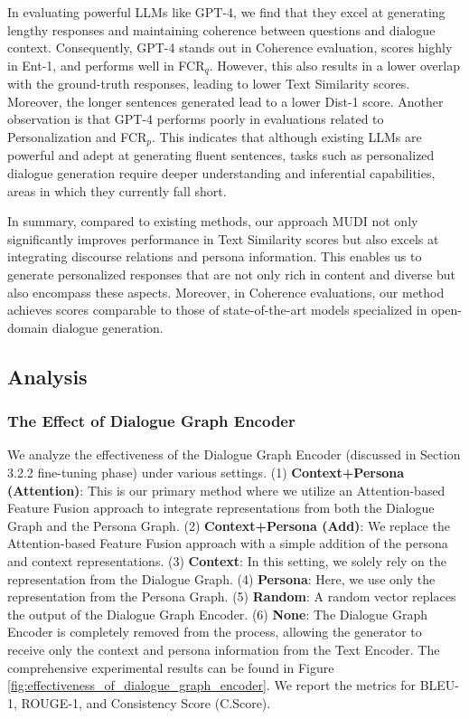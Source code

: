 \documentclass[letterpaper]{article} %
\begin{document}
In evaluating powerful LLMs like GPT-4, we find that they excel at generating lengthy responses and maintaining coherence between questions and dialogue context. Consequently, GPT-4 stands out in Coherence evaluation, scores highly in Ent-1, and performs well in FCR$_q$. However, this also results in a lower overlap with the ground-truth responses, leading to lower Text Similarity scores. Moreover, the longer sentences generated lead to a lower Dist-1 score. Another observation is that GPT-4 performs poorly in evaluations related to Personalization and FCR$_p$. This indicates that although existing LLMs are powerful and adept at generating fluent sentences, tasks such as personalized dialogue generation require deeper understanding and inferential capabilities, areas in which they currently fall short.

In summary, compared to existing methods, our approach MUDI not only significantly improves performance in Text Similarity scores but also excels at integrating discourse relations and persona information. This enables us to generate personalized responses that are not only rich in content and diverse but also encompass these aspects. Moreover, in Coherence evaluations, our method achieves scores comparable to those of state-of-the-art models specialized in open-domain dialogue generation.

\subsection{Analysis}

\subsubsection{The Effect of Dialogue Graph Encoder}
We analyze the effectiveness of the Dialogue Graph Encoder (discussed in Section 3.2.2 fine-tuning phase) under various settings. (1) \textbf{Context+Persona (Attention)}: This is our primary method where we utilize an Attention-based Feature Fusion approach to integrate representations from both the Dialogue Graph and the Persona Graph. (2) \textbf{Context+Persona (Add)}: We replace the Attention-based Feature Fusion approach with a simple addition of the persona and context representations. (3) \textbf{Context}: In this setting, we solely rely on the representation from the Dialogue Graph. (4) \textbf{Persona}: Here, we use only the representation from the Persona Graph. (5) \textbf{Random}: A random vector replaces the output of the Dialogue Graph Encoder. (6) \textbf{None}: The Dialogue Graph Encoder is completely removed from the process, allowing the generator to receive only the context and persona information from the Text Encoder. The comprehensive experimental results can be found in Figure \ref{fig:effectiveness_of_dialogue_graph_encoder}. We report the metrics for BLEU-1, ROUGE-1, and Consistency Score (C.Score).
\end{document}
